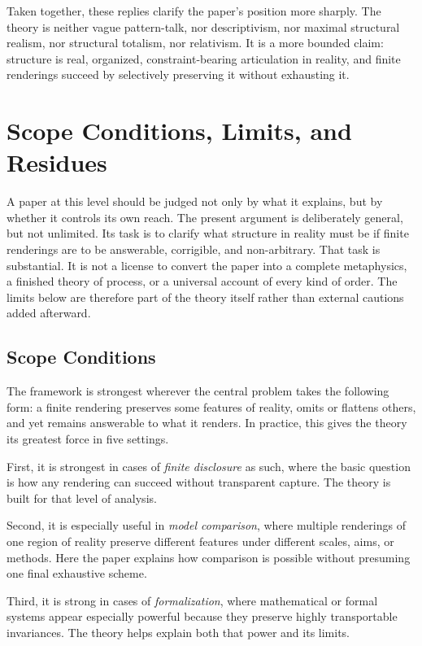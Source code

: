 \documentclass[11pt]{article}
\renewcommand{\emph}[1]{\textit{#1}}
\begin{document}
Taken together, these replies clarify the paper's position more sharply. The theory is neither vague pattern-talk, nor descriptivism, nor maximal structural realism, nor structural totalism, nor relativism. It is a more bounded claim: structure is real, organized, constraint-bearing articulation in reality, and finite renderings succeed by selectively preserving it without exhausting it.

\section{Scope Conditions, Limits, and Residues}

A paper at this level should be judged not only by what it explains, but by whether it controls its own reach. The present argument is deliberately general, but not unlimited. Its task is to clarify what structure in reality must be if finite renderings are to be answerable, corrigible, and non-arbitrary. That task is substantial. It is not a license to convert the paper into a complete metaphysics, a finished theory of process, or a universal account of every kind of order. The limits below are therefore part of the theory itself rather than external cautions added afterward.

\subsection{Scope Conditions}

The framework is strongest wherever the central problem takes the following form: a finite rendering preserves some features of reality, omits or flattens others, and yet remains answerable to what it renders. In practice, this gives the theory its greatest force in five settings.

First, it is strongest in cases of \emph{finite disclosure} as such, where the basic question is how any rendering can succeed without transparent capture. The theory is built for that level of analysis.

Second, it is especially useful in \emph{model comparison}, where multiple renderings of one region of reality preserve different features under different scales, aims, or methods. Here the paper explains how comparison is possible without presuming one final exhaustive scheme.

Third, it is strong in cases of \emph{formalization}, where mathematical or formal systems appear especially powerful because they preserve highly transportable invariances. The theory helps explain both that power and its limits.
\end{document}
